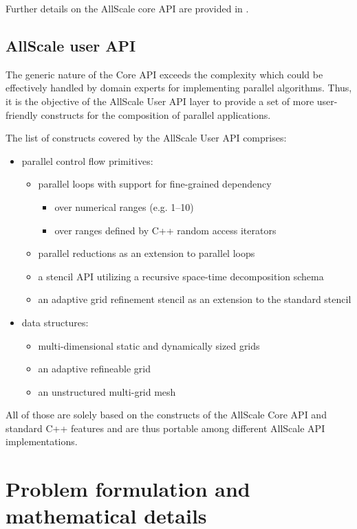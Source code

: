 \documentclass[acmsmall,review,anonymous]{acmart}\settopmatter{printfolios=true,printccs=false,printacmref=false}
\begin{document}
Further details on the AllScale core API are provided in \cite{allscale_architecure_2017}.

\subsection{AllScale user API}

The generic nature of the Core API exceeds the complexity which could be
effectively handled by domain experts for implementing parallel algorithms.
Thus, it is the objective of the AllScale User API layer to provide a set of more
user-friendly constructs for the composition of parallel applications.

The list of constructs covered by the AllScale User API comprises:
\begin{itemize}
  \item parallel control flow primitives:
  \begin{itemize}
    \item parallel loops with support for fine-grained dependency
    \begin{itemize}
       \item  over numerical ranges (e.g. 1--10)
       \item  over ranges defined by C++ random access iterators
    \end{itemize}
    \item parallel reductions as an extension to parallel loops
    \item a stencil API utilizing a recursive space-time decomposition schema
    \item an adaptive grid refinement stencil as an extension to the standard stencil
  \end{itemize}
  \item data structures:
  \begin{itemize}
  \item  multi-dimensional static and dynamically sized grids
  \item  an adaptive refineable grid 
  \item  an unstructured multi-grid mesh 
  \end{itemize}
\end{itemize}

All of those are solely based on the constructs of the AllScale Core API and
standard C++ features and are thus portable among different AllScale API
implementations.

\section{Problem formulation and mathematical details}
\end{document}
